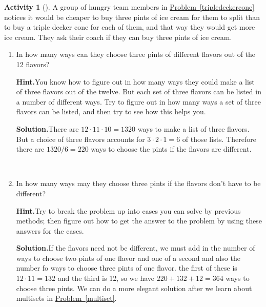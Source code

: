 \documentclass[10pt,]{book}
\theoremstyle{plain}
\theoremstyle{definition}
\newtheorem{activity}[project]{Activity}
\numberwithin{equation}{chapter}
\begin{document}
\begin{activity}[]\label{icecreaminpints}
A group of hungry team members in \hyperref[tripledeckercone]{Problem~\ref{tripledeckercone}} notices it would be cheaper to buy three pints of ice cream for them to split than to buy a triple decker cone for each of them, and that way they would get more ice cream. They ask their coach if they can buy three pints of ice cream.%
~\par
\begin{enumerate}[label=(\alph*)]
 \item In how many ways can they choose three pints of different flavors out of the 12 flavors?%
\par\medskip\noindent%
\textbf{Hint.}\quad You know how to figure out in how many ways they could make a list of three flavors out of the twelve. But each set of three flavors can be listed in a number of different ways. Try to figure out in how many ways a set of three flavors can be listed, and then try to see how this helps you.%
\par\medskip\noindent%
\textbf{Solution.}\quad There are \(12\cdot11\cdot 10 = 1320\) ways to make a list of three flavors. But a choice of three flavors accounts for \(3\cdot2\cdot1 = 6\) of those lists. Therefore there are \(1320/6=220\) ways to choose the pints if the flavors are different.%

~\par
\item In how many ways may they choose three pints if the flavors don't have to be different?%
\par\medskip\noindent%
\textbf{Hint.}\quad Try to break the problem up into cases you can solve by previous methods; then figure out how to get the answer to the problem by using these answers for the cases.%
\par\medskip\noindent%
\textbf{Solution.}\quad If the flavors need not be different, we must add in the number of ways to choose two pints of one flavor and one of a second and also the number fo ways to choose three pints of one flavor. the first of these is \(12\cdot11
=132\) and the third is 12, so we have \(220+132+12=364\) ways to choose three pints. We can do a more elegant solution after we learn about multisets in \hyperref[multiset]{Problem~\ref{multiset}}.%

\end{enumerate}
\end{activity}
\end{document}

